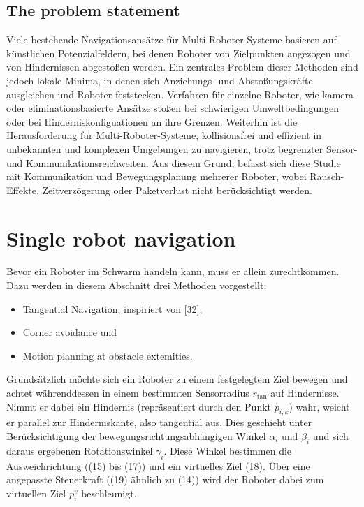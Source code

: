 \documentclass[conference]{IEEEtran}
\begin{document}
\subsection*{The problem statement}
Viele bestehende Navigationsansätze für Multi-Roboter-Systeme basieren auf künstlichen 
Potenzialfeldern, bei denen Roboter von Zielpunkten angezogen und von Hindernissen 
abgestoßen werden. Ein zentrales Problem dieser Methoden sind jedoch lokale Minima, in 
denen sich Anziehungs- und Abstoßungskräfte ausgleichen und Roboter feststecken. 
Verfahren für einzelne Roboter, wie kamera- oder eliminationsbasierte Ansätze stoßen bei 
schwierigen Umweltbedingungen oder bei Hinderniskonfiguationen an ihre Grenzen.
Weiterhin ist die Herausforderung für Multi-Roboter-Systeme, kollisionsfrei und 
effizient in unbekannten und komplexen Umgebungen zu navigieren, trotz begrenzter 
Sensor- und Kommunikationsreichweiten. 
Aus diesem Grund, befasst sich diese Studie mit Kommunikation und Bewegungsplanung mehrerer Roboter,
wobei Rausch-Effekte, Zeitverzögerung oder Paketverlust nicht berücksichtigt werden.


\section{Single robot navigation}
Bevor ein Roboter im Schwarm handeln kann, muss er allein zurechtkommen. Dazu 
werden in diesem Abschnitt drei Methoden vorgestellt:
\begin{itemize}
    \item Tangential Navigation, inspiriert von [32],
    \item Corner avoidance und
    \item Motion planning at obstacle extemities.
\end{itemize}

Grundsätzlich möchte sich ein Roboter zu einem festgelegtem Ziel bewegen und achtet 
währenddessen in einem bestimmten Sensorradius \(r_{\mathrm{tan}}\) auf Hindernisse. Nimmt 
er dabei ein Hindernis (repräsentiert durch den Punkt \( \hat{p}_{i,k} \)) wahr, weicht 
er parallel zur Hinderniskante, also tangential aus. Dies geschieht unter Berücksichtigung der bewegungsrichtungsabhängigen Winkel \( \alpha_i \) und 
\( \beta_i \) und sich daraus ergebenen Rotationswinkel \( \gamma_i \). Diese Winkel bestimmen die Ausweichrichtung 
((15) bis (17)) und ein virtuelles Ziel (18). Über eine angepasste Steuerkraft 
((19) ähnlich zu (14)) wird der Roboter dabei zum virtuellen Ziel $p_i^v$ beschleunigt.
\end{document}
